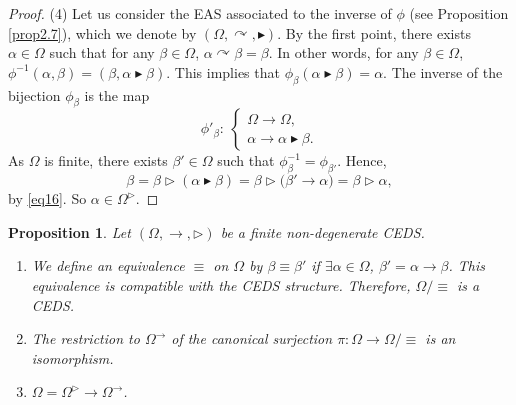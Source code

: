 \documentclass[pdftex]{sigma}
\numberwithin{equation}{section}
\newtheorem{Proposition}[Theorem]{Proposition}
 { \theoremstyle{definition}
\newtheorem{Definition}[Theorem]{Definition}
\newtheorem{Note}[Theorem]{Note}
\newtheorem{Example}[Theorem]{Example}
\newtheorem{Remark}[Theorem]{Remark}
\newtheorem{Notation}[Theorem]{Notation}}
\begin{document}
\begin{proof}
(4) Let us consider the EAS associated to the inverse of $\phi$ (see Proposition \ref{prop2.7}), which we denote by $(\Omega,\curvearrowright,\blacktriangleright)$.
By the first point, there exists $\alpha \in \Omega$ such that for any $\beta \in \Omega$, $\alpha \curvearrowright \beta=\beta$. In other words, for any $\beta \in \Omega$,
$\phi^{-1}(\alpha,\beta)=(\beta,\alpha \blacktriangleright \beta)$.
This implies that $\phi_\beta(\alpha \blacktriangleright \beta)=\alpha$. The inverse of the bijection $\phi_\beta$ is the map
\[\phi'_\beta\colon \ \begin{cases}
\Omega \longrightarrow \Omega,\\
\alpha \longrightarrow \alpha \blacktriangleright \beta.
\end{cases}\]
As $\Omega$ is finite, there exists $\beta'\in \Omega$ such that $\phi_\beta^{-1}=\phi_{\beta'}$. Hence,
\[\beta=\beta \triangleright (\alpha \blacktriangleright \beta)=\beta\triangleright \bigl(\beta'\rightarrow \alpha\bigr)=\beta \triangleright \alpha,\]
by \eqref{eq16}. So $\alpha \in \Omega^\triangleright$. \end{proof}

\begin{Proposition}\label{prop3.11}
Let $(\Omega,\rightarrow,\triangleright)$ be a finite non-degenerate CEDS.
\begin{enumerate}\itemsep=0pt
\item[$(1)$] We define an equivalence $\equiv$ on $\Omega$ by
$\beta \equiv \beta'$ if $\exists \alpha \in \Omega$, $\beta' =\alpha\rightarrow \beta$.
This equivalence is compatible with the CEDS structure. Therefore, $\Omega/\equiv$ is a CEDS.
\item[$(2)$] The restriction to $\Omega^\rightarrow$ of the canonical surjection $\pi\colon\Omega\longrightarrow \Omega/\equiv$ is an isomorphism.
\item[$(3)$] $\Omega=\Omega^\triangleright\rightarrow \Omega^\rightarrow$.
\end{enumerate}\end{Proposition}
\end{document}
